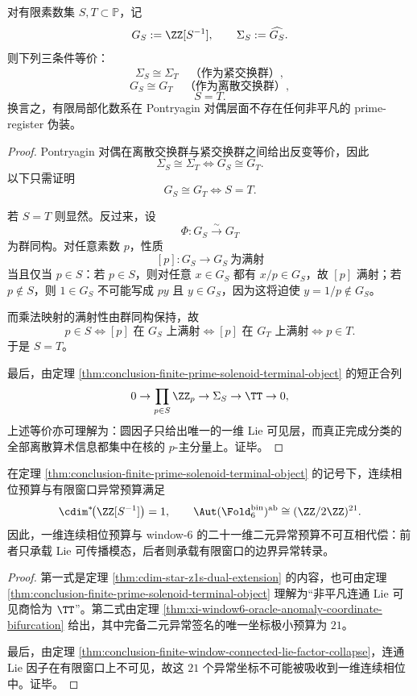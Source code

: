 \begin{theorem}\label{thm:conclusion-finite-prime-localization-pontryagin-rigidity}
对有限素数集 \(S,T\subset \mathbb P\)，记
\[
G_S:=\ZZ[S^{-1}],
\qquad
\Sigma_S:=\widehat{G_S}.
\]
则下列三条件等价：
\[
\Sigma_S\cong \Sigma_T
\quad\text{（作为紧交换群）},
\]
\[
G_S\cong G_T
\quad\text{（作为离散交换群）},
\]
\[
S=T.
\]
换言之，有限局部化数系在 Pontryagin 对偶层面不存在任何非平凡的 prime-register 伪装。
\end{theorem}
\begin{proof}
Pontryagin 对偶在离散交换群与紧交换群之间给出反变等价，因此
\[
\Sigma_S\cong \Sigma_T
\iff
G_S\cong G_T.
\]
以下只需证明
\[
G_S\cong G_T
\iff
S=T.
\]

若 \(S=T\) 则显然。反过来，设
\[
\Phi:G_S\xrightarrow{\sim}G_T
\]
为群同构。对任意素数 \(p\)，性质
\[
[p]:G_S\to G_S\ \text{为满射}
\]
当且仅当 \(p\in S\)：若 \(p\in S\)，则对任意 \(x\in G_S\) 都有 \(x/p\in G_S\)，故 \([p]\) 满射；若 \(p\notin S\)，则 \(1\in G_S\) 不可能写成 \(py\) 且 \(y\in G_S\)，因为这将迫使 \(y=1/p\notin G_S\)。

而乘法映射的满射性由群同构保持，故
\[
p\in S
\iff
[p]\text{ 在 }G_S\text{ 上满射}
\iff
[p]\text{ 在 }G_T\text{ 上满射}
\iff
p\in T.
\]
于是 \(S=T\)。

最后，由定理 \ref{thm:conclusion-finite-prime-solenoid-terminal-object} 的短正合列
\[
0\to \prod_{p\in S}\ZZ_p\to \Sigma_S\to \TT\to 0,
\]
上述等价亦可理解为：圆因子只给出唯一的一维 Lie 可见层，而真正完成分类的全部离散算术信息都集中在核的 \(p\)-主分量上。证毕。
\end{proof}

\begin{corollary}[圆维与异常秩的二预算分裂]\label{cor:conclusion-circle-dimension-anomaly-rank-budget-splitting}
在定理 \ref{thm:conclusion-finite-prime-solenoid-terminal-object} 的记号下，连续相位预算与有限窗口异常预算满足
\[
\cdim^\ast\!\bigl(\ZZ[S^{-1}]\bigr)=1,
\qquad
\Aut(\Fold_6^{\mathrm{bin}})^{\mathrm{ab}}\cong (\ZZ/2\ZZ)^{21}.
\]
因此，一维连续相位预算与 window-\(6\) 的二十一维二元异常预算不可互相代偿：前者只承载 Lie 可传播模态，后者则承载有限窗口的边界异常转录。
\end{corollary}
\begin{proof}
第一式是定理 \ref{thm:cdim-star-z1s-dual-extension} 的内容，也可由定理 \ref{thm:conclusion-finite-prime-solenoid-terminal-object} 理解为“非平凡连通 Lie 可见商恰为 \(\TT\)”。第二式由定理 \ref{thm:xi-window6-oracle-anomaly-coordinate-bifurcation} 给出，其中完备二元异常签名的唯一坐标极小预算为 \(21\)。

最后，由定理 \ref{thm:conclusion-finite-window-connected-lie-factor-collapse}，连通 Lie 因子在有限窗口上不可见，故这 \(21\) 个异常坐标不可能被吸收到一维连续相位中。证毕。
\end{proof}


